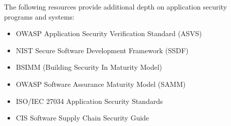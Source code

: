\documentclass[11pt,letterpaper]{article}
\begin{document}
The following resources provide additional depth on application security programs and systems:

\begin{itemize}[leftmargin=2em]
    \item OWASP Application Security Verification Standard (ASVS)
    \item NIST Secure Software Development Framework (SSDF)
    \item BSIMM (Building Security In Maturity Model)
    \item OWASP Software Assurance Maturity Model (SAMM)
    \item ISO/IEC 27034 Application Security Standards
    \item CIS Software Supply Chain Security Guide
\end{itemize}
\end{document}
